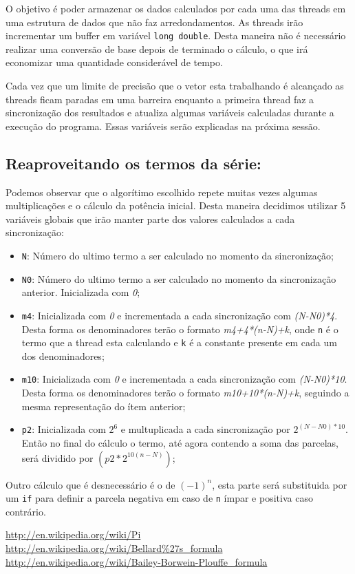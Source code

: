 \documentclass[12pt,a4paper]{article}
\begin{document}
O objetivo é poder armazenar os dados calculados por cada uma das threads em uma estrutura de dados que não faz arredondamentos. As threads irão incrementar um buffer em variável \verb+long double+. Desta maneira não é necessário realizar uma conversão de base depois de terminado o cálculo, o que irá economizar uma quantidade considerável de tempo.

Cada vez que um limite de precisão que o vetor esta trabalhando é alcançado as threads ficam paradas em uma barreira enquanto a primeira thread faz a sincronização dos resultados e atualiza algumas variáveis calculadas durante a execução do programa. Essas variáveis serão explicadas na próxima sessão.

\subsection{Reaproveitando os termos da série:}

Podemos observar que o algorítimo escolhido repete muitas vezes algumas multiplicações e o cálculo da potência inicial. Desta maneira decidimos utilizar 5 variáveis globais que irão manter parte dos valores calculados a cada sincronização:

\begin{itemize}

\item \verb+N+: Número do ultimo termo a ser calculado no momento da sincronização;
\item \verb+N0+: Número do ultimo termo a ser calculado no momento da sincronização anterior. Inicializada com \emph{0};
\item \verb+m4+: Inicializada com \emph{0} e incrementada a cada sincronização com \emph{(N-N0)*4}. Desta forma os denominadores terão o formato \emph{m4+4*(n-N)+k}, onde \verb+n+ é o termo que a thread esta calculando e \verb+k+ é a constante presente em cada um dos denominadores;
\item \verb+m10+: Inicializada com \emph{0} e incrementada a cada sincronização com \emph{(N-N0)*10}. Desta forma os denominadores terão o formato \emph{m10+10*(n-N)+k}, seguindo a mesma representação do ítem anterior;
\item \verb+p2+: Inicializada com \emph{$2^6$} e multuplicada a cada sincronização por \emph{$2^{(N-N0)*10}$}. Então no final do cálculo o termo, até agora contendo a soma das parcelas, será dividido por \emph{$(p2*2^{10(n-N)})$};

\end{itemize}

Outro cálculo que é desnecessário é o de $(-1)^n$, esta parte será substituida por um \verb+if+ para definir a parcela negativa em caso de \verb+n+ ímpar e positiva caso contrário.

\begin{thebibliography}{99}
\url{http://en.wikipedia.org/wiki/Pi}
\url{http://en.wikipedia.org/wiki/Bellard%27s_formula}
\url{http://en.wikipedia.org/wiki/Bailey-Borwein-Plouffe\_formula}
\end{thebibliography}
\end{document}
